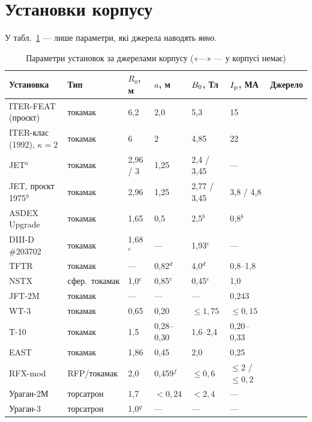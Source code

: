 \section{Установки корпусу}\label{sec:01-devices}

У табл.~\ref{tab:01-devices} --- лише параметри, які джерела наводять \emph{явно}.

\begin{table}[h]
\centering\footnotesize\setlength{\tabcolsep}{4pt}\renewcommand{\arraystretch}{0.92}
\caption{Параметри установок за джерелами корпусу («---» --- у корпусі немає)}\label{tab:01-devices}
\begin{tabular}{@{}lllllll@{}}
\toprule
Установка & Тип & $R_0$, м & $a$, м & $B_{0}$, Тл & $I_{\mathrm{p}}$, МА & Джерело \\
\midrule
ITER-FEAT (проєкт) & токамак & 6,2 & 2,0 & 5,3 & 15 & \cite{Mazzucato2000,Moskvitina2010} \\
ITER-клас (1992), $\kappa=2$ & токамак & 6 & 2 & 4,85 & 22 & \cite{Fukuyama1992} \\
JET$^{a}$ & токамак & 2,96 / 3 & 1,25 & 2,4 / 3,45 & --- & \cite{Hoppe2022,Fukuyama1992} \\
JET, проєкт 1975$^{h}$ & токамак & 2,96 & 1,25 & 2,77 / 3,45 & 3,8 / 4,8 & \cite[с.~83]{JET1975} \\
ASDEX Upgrade & токамак & 1,65 & 0,5 & 2,5$^{b}$ & 0,8$^{b}$ & \cite{AhoMantila2011} \\
DIII-D \#203702 & токамак & 1,68$^{c}$ & --- & 1,93$^{c}$ & --- & \cite{ProjViz} \\
TFTR & токамак & --- & 0,82$^{d}$ & 4,0$^{d}$ & 0,8--1,8 & \cite{Wong1987,Park1989} \\
NSTX & сфер.\ токамак & 1,0$^{e}$ & 0,85$^{e}$ & 0,45$^{e}$ & 1,0 & \cite{Tyshchenko2021,Jardin2000} \\
JFT-2M & токамак & --- & --- & --- & 0,243 & \cite{Ida2001} \\
WT-3 & токамак & 0,65 & 0,20 & $\le1{,}75$ & $\le0{,}15$ & \cite{Hanada1990} \\
T-10 & токамак & 1,5 & 0,28--0,30 & 1,6--2,4 & 0,20--0,33 & \cite{Marchuk2025} \\
EAST & токамак & 1,86 & 0,45 & 2,0 & 0,25 & \cite{Marchuk2025} \\
RFX-mod & RFP/токамак & 2,0 & 0,459$^{f}$ & $\le0{,}6$ & $\le2$ / $\le0{,}2$ & \cite{Merlo2011} \\
Ураган-2М & торсатрон & 1,7 & $<0{,}24$ & $<2{,}4$ & --- & \cite{Martsenyuk2025} \\
Ураган-3 & торсатрон & 1,0$^{g}$ & --- & --- & --- & \cite{Zaitsev2003} \\

\end{tabular}
\end{table}
